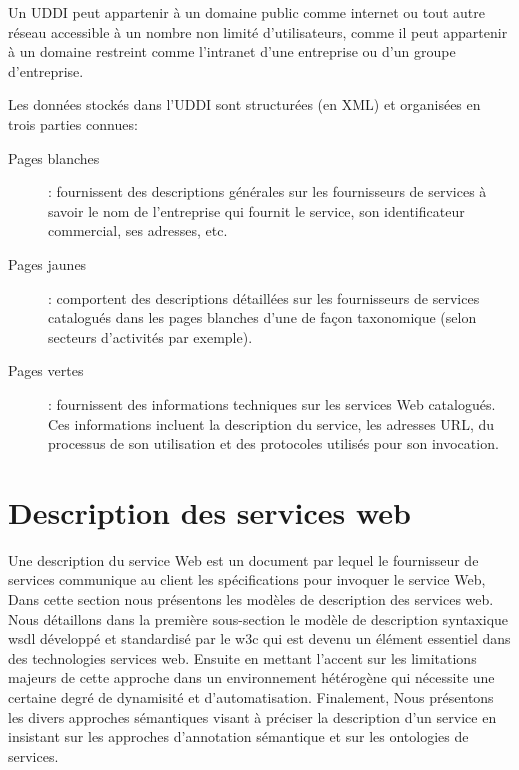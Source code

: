 	Un \textsc{UDDI} peut appartenir à un domaine public comme internet ou tout autre réseau accessible à un nombre
       	non limité d’utilisateurs, comme il peut appartenir à un domaine restreint comme l'intranet d’une entreprise 
	ou d'un groupe d'entreprise.

	Les données stockés dans l'UDDI sont structurées (en \textsc{XML}) et organisées en trois parties 
	connues:

	\begin{description} %
	    \item[Pages blanches]:
		fournissent des descriptions générales sur les fournisseurs de services à savoir le nom de 
		l'entreprise qui fournit le service, son identificateur commercial, ses adresses, etc.

	    \item[Pages jaunes]:
		comportent des descriptions détaillées sur les fournisseurs de services catalogués dans les pages 
		blanches d'une de façon taxonomique (selon secteurs d'activités par exemple).

	    \item[Pages vertes]:
		fournissent des informations techniques sur les services Web catalogués. Ces informations incluent 
		la description du service, les adresses \textsc{URL}, du processus de son utilisation 
		et des protocoles utilisés pour son invocation.

	\end{description}



\section{Description des services web} 

    Une description du service Web est un document par lequel le fournisseur de services communique au client 
    les spécifications pour invoquer le service Web, Dans cette section nous présentons les modèles de description
    des services web. Nous détaillons dans la première sous-section le modèle de description syntaxique \acrshort{wsdl}
    \cite{chinnici2007web} développé et standardisé par le \acrshort{w3c} qui est devenu un élément essentiel 
    dans des technologies services web. Ensuite en mettant l'accent sur les limitations majeurs de cette
    approche dans un environnement hétérogène qui nécessite une certaine degré de dynamisité et d'automatisation.
    Finalement, Nous présentons les divers approches sémantiques visant à préciser la description d'un
    service en insistant sur les approches d'annotation sémantique et sur les ontologies de services.

